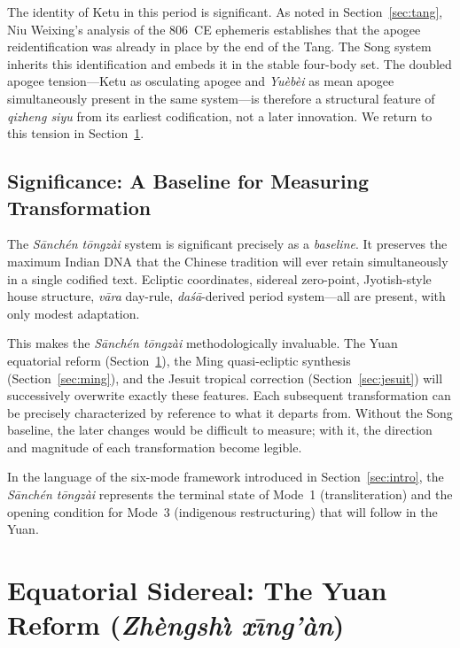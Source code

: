 \documentclass[10pt,a4paper]{article}
\begin{document}
The identity of Ketu in this period is significant.  As noted in
Section~\ref{sec:tang}, Niu Weixing's analysis of the 806~CE ephemeris
establishes that the apogee reidentification was already in place by
the end of the Tang.  The Song system inherits this identification
and embeds it in the stable four-body set.  The doubled apogee
tension---Ketu as osculating apogee and \textit{Yu\`eb\`ei} as mean
apogee simultaneously present in the same system---is therefore a
structural feature of \textit{qizheng siyu} from its earliest codification,
not a later innovation.  We return to this tension in
Section~\ref{sec:yuan}.

\subsection*{Significance: A Baseline for Measuring Transformation}

The \textit{S\={a}nch\'{e}n t\={o}ngz\`{a}i} system is significant precisely as a \emph{baseline}.
It preserves the maximum Indian DNA that the Chinese tradition will
ever retain simultaneously in a single codified text.  Ecliptic
coordinates, sidereal zero-point, Jyotish-style house structure,
\textit{v\={a}ra} day-rule, \textit{da\'{s}\={a}}-derived period
system---all are present, with only modest adaptation.

This makes the \textit{S\={a}nch\'{e}n t\={o}ngz\`{a}i} methodologically invaluable.  The
Yuan equatorial reform (Section~\ref{sec:yuan}), the Ming quasi-ecliptic
synthesis (Section~\ref{sec:ming}), and the Jesuit tropical correction
(Section~\ref{sec:jesuit}) will successively overwrite exactly these
features.  Each subsequent transformation can be precisely characterized
by reference to what it departs from.  Without the Song baseline, the
later changes would be difficult to measure; with it, the direction and
magnitude of each transformation become legible.

In the language of the six-mode framework introduced in
Section~\ref{sec:intro}, the \textit{S\={a}nch\'{e}n t\={o}ngz\`{a}i} represents the terminal
state of Mode~1 (transliteration) and the opening condition for
Mode~3 (indigenous restructuring) that will follow in the Yuan.

\section{Equatorial Sidereal: The Yuan Reform (\textit{Zh\`{e}ngsh\`{\i} x\={\i}ng'\`{a}n})}
\label{sec:yuan}
\end{document}
